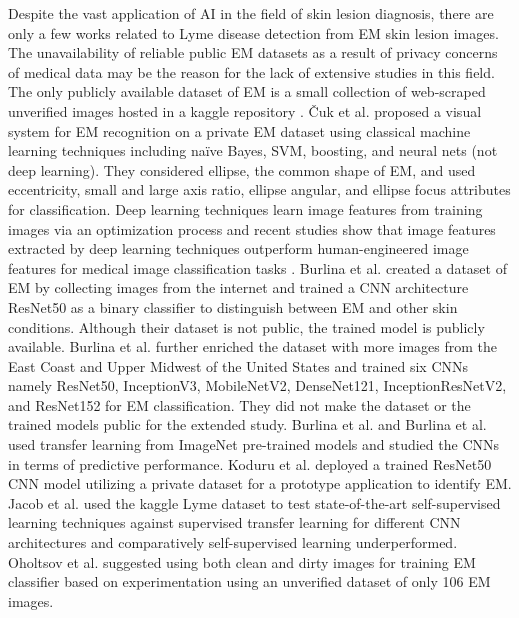 Despite the vast application of AI in the field of skin lesion diagnosis, there are only a few works related to Lyme disease detection from EM skin lesion images. The unavailability of reliable public EM datasets as a result of privacy concerns of medical data may be the reason for the lack of extensive studies in this field. The only publicly available dataset of EM is a small collection of web-scraped unverified images hosted in a kaggle repository \cite{LymeDatasetKaggle}. Čuk et al. \cite{Cuk2014} proposed a visual system for EM recognition on a private EM dataset using classical machine learning techniques including naïve Bayes, SVM, boosting, and neural nets (not deep learning). They considered ellipse, the common shape of EM, and used eccentricity, small and large axis ratio, ellipse angular, and ellipse focus attributes for classification. Deep learning techniques learn image features from training images via an optimization process and recent studies show that image features extracted by deep learning techniques outperform human-engineered image features for medical image classification tasks \cite{Burlina2020}. Burlina et al. \cite{Burlina2018} created a dataset of EM by collecting images from the internet and trained a CNN architecture ResNet50 as a binary classifier to distinguish between EM and other skin conditions. Although their dataset is not public, the trained model is publicly available. Burlina et al. \cite{Burlina2020} further enriched the dataset with more images from the East Coast and Upper Midwest of the United States and trained six CNNs namely ResNet50, InceptionV3, MobileNetV2, DenseNet121, InceptionResNetV2, and ResNet152 for EM classification. They did not make the dataset or the trained models public for the extended study. Burlina et al. \cite{Burlina2018} and Burlina et al. \cite{Burlina2020} used transfer learning from ImageNet pre-trained models and studied the CNNs in terms of predictive performance. Koduru et al. \cite{Koduru2021} deployed a trained ResNet50 CNN model utilizing a private dataset  for a prototype application to identify EM. Jacob et al. \cite{Jacob2022} used the kaggle Lyme dataset \cite{LymeDatasetKaggle} to test state-of-the-art self-supervised learning techniques against supervised transfer learning for different CNN architectures and comparatively self-supervised learning underperformed. Oholtsov et al. \cite{Oholtsov2023} suggested using both clean and dirty images for training EM classifier based on experimentation using an unverified dataset of only 106 EM images.

